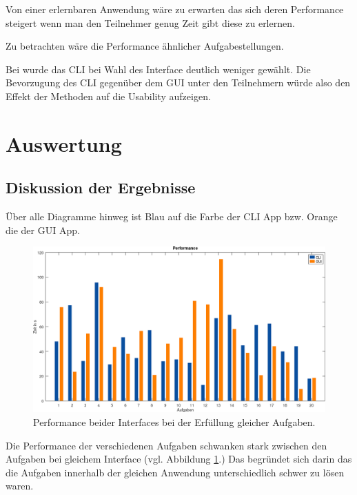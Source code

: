 \documentclass[oneside,bibliography=totocnumbered,BCOR=5mm]{scrbook}
\begin{document}

Von einer erlernbaren Anwendung wäre zu erwarten das sich deren Performance
steigert wenn man den Teilnehmer genug Zeit gibt diese zu erlernen.

\medskip

Zu betrachten wäre die Performance ähnlicher Aufgabestellungen.


Bei \textcite{Westerman_1997} wurde das CLI bei Wahl des Interface deutlich weniger
gewählt. Die Bevorzugung des CLI gegenüber dem GUI unter den Teilnehmern würde
also den Effekt der Methoden auf die Usability aufzeigen.

\section{Auswertung}
\label{sec:auswertung}

\subsection{Diskussion der Ergebnisse}

Über alle Diagramme hinweg ist Blau auf die Farbe der CLI App bzw. Orange die
der GUI App.

\begin{figure}[H]
  \centering
  \includegraphics[scale=0.36]{performance.png}
  \caption{Performance beider Interfaces bei der Erfüllung gleicher Aufgaben.}
  \label{fig:performance}
\end{figure}

Die Performance der verschiedenen Aufgaben schwanken stark zwischen den Aufgaben
bei gleichem Interface (vgl. Abbildung \ref{fig:performance}.) Das begründet
sich darin das die Aufgaben innerhalb der gleichen Anwendung unterschiedlich
schwer zu lösen waren.
\end{document}
